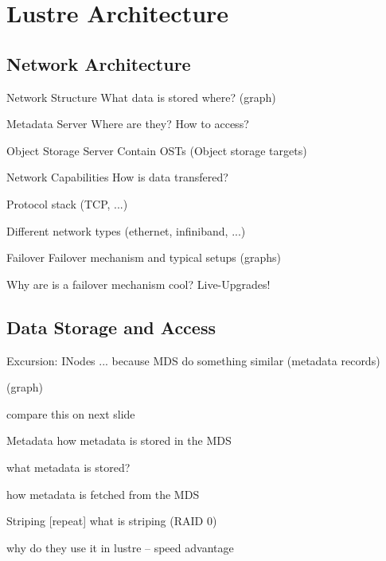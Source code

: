 \documentclass[compress,t]{beamer}
\newcommand{\sectiontoc}{
    \begin{frame}{\textbf{\insertsectionhead}}
        \tableofcontents[current]
    \end{frame}

    \addtocounter{framenumber}{-1}%
}
\begin{document}

\section{Lustre Architecture}
\sectiontoc

\subsection{Network Architecture}
\begin{frame}{Network Structure}
    What data is stored where? (graph)
\end{frame}
\begin{frame}{Metadata Server}
    Where are they? How to access?
\end{frame}
\begin{frame}{Object Storage Server}
    Contain OSTs (Object storage targets)
\end{frame}
\begin{frame}{Network Capabilities}
    How is data transfered?

    Protocol stack (TCP, ...)

    Different network types (ethernet, infiniband, ...)
\end{frame}
\begin{frame}{Failover}
    Failover mechanism and typical setups (graphs)

    Why are is a failover mechanism cool? Live-Upgrades!
\end{frame}

\subsection{Data Storage and Access}
\begin{frame}{Excursion: INodes}
    ... because MDS do something similar (metadata records)

    (graph)

    compare this on next slide
\end{frame}
\begin{frame}{Metadata}
    how metadata is stored in the MDS

    what metadata is stored?

    how metadata is fetched from the MDS
\end{frame}
\begin{frame}{Striping}
    [repeat] what is striping (RAID 0)

    why do they use it in lustre -- speed advantage
\end{frame}
\end{document}
